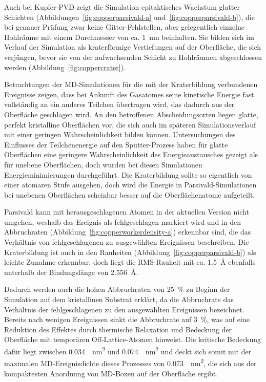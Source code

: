 Auch bei Kupfer-PVD zeigt die Simulation epitaktisches Wachstum glatter Schichten (Abbildungen~\ref{fig:copperparsivald-a} und~\ref{fig:copperparsivald-b}), die bei genauer Prüfung zwar keine Gitter-Fehlstellen, aber gelegentlich einzelne Hohlräume mit einem Durchmesser von ca. \SI{1}{\nano\meter} beinhalten.
Sie bilden sich im Verlauf der Simulation als kraterförmige Vertiefungen auf der Oberfläche, die sich verjüngen, bevor sie von der aufwachsenden Schicht zu Hohlräumen abgeschlossen werden (Abbildung~\ref{fig:coppercrater}).

Betrachtungen der MD-Simulationen für die mit der Kraterbildung verbundenen Ereignisse zeigen, dass bei Ankunft des Gasatomes seine kinetische Energie fast vollständig an ein anderes Teilchen übertragen wird, das dadurch aus der Oberfläche geschlagen wird.
An den betroffenen Abscheidungsorten liegen glatte, perfekt kristalline Oberflächen vor, die sich auch im späteren Simulationsverlauf mit einer geringen Wahrscheinlichkeit bilden können.
Untersuchungen des Einflusses der Teilchenenergie auf den Sputter-Prozess\cite{zhou_atomistic_1998} haben für glatte Oberflächen eine geringere Wahrscheinlichkeit des Energieaustausches gezeigt als für unebene Oberflächen, doch wurden bei diesen Simulationen Energieminimierungen durchgeführt.
Die Kraterbildung sollte so eigentlich von einer atomaren Stufe ausgehen, doch wird die Energie in Parsivald-Simulationen bei unebenen Oberflächen scheinbar besser auf die Oberflächenatome aufgeteilt.

Parsivald kann mit herausgeschlagenen Atomen in der aktuellen Version nicht umgehen, weshalb das Ereignis als fehlgeschlagen markiert wird und in den Abbruchraten (Abbildung~\ref{fig:copperworkerdensity-a}) erkennbar sind, die das Verhältnis von fehlgeschlagenen zu ausgewählten Ereignissen beschreiben.
Die Kraterbildung ist auch in den Rauheiten (Abbildung~\ref{fig:copperparsivald-b}) als leichte Zunahme erkennbar, doch liegt die RMS-Rauheit mit ca. \SI{1.5}{\angstrom} ebenfalls unterhalb der Bindungslänge von \SI{2.556}{\angstrom}.

Dadurch werden auch die hohen Abbruchraten von \SI{25}{\percent} zu Beginn der Simulation auf dem kristallinen Substrat erklärt, da die Abbruchrate das Verhältnis der fehlgeschlagenen zu den ausgewählten Ereignissen bezeichnet.
Bereits nach wenigen Ereignissen sinkt die Abbruchrate auf \SI{3}{\percent}, was auf eine Reduktion des Effektes durch thermische Relaxation und Bedeckung der Oberfläche mit temporären Off-Lattice-Atomen hinweist.
Die kritische Bedeckung dafür liegt zwischen \SI{0.034}{\per\nano\meter\squared} und \SI{0.074}{\per\nano\meter\squared} und deckt sich somit mit der maximalen MD-Ereignisdichte dieses Prozesses von \SI{0.073}{\per\nano\meter\squared}, die sich aus der kompaktesten Anordnung von MD-Boxen auf der Oberfläche ergibt.

